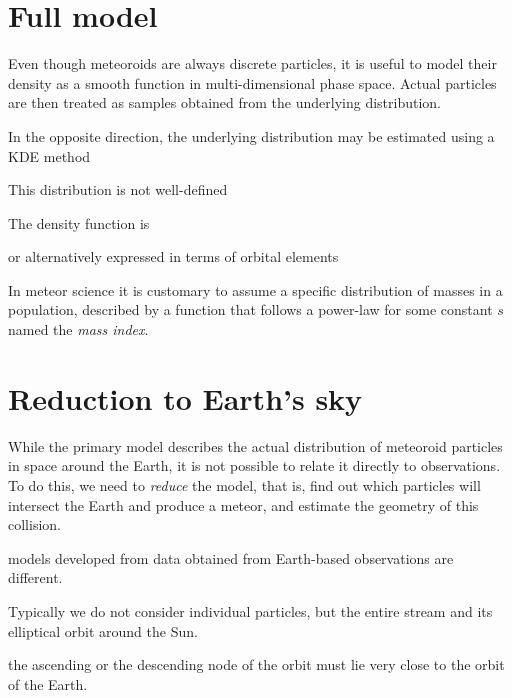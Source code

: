 
\section{Full model} \label{pf}

    Even though meteoroids are always discrete particles, it is useful to model their density as a smooth
    function in multi-dimensional phase space.
    Actual particles are then treated as samples obtained from the underlying distribution.

    In the opposite direction, the underlying distribution may be estimated using a KDE method

    This distribution is not well-defined


    The density function is 
    \eqn{eq:pf-rv}{
        \varrho(\vec{r}, \vec{v}, t) \in \left[0, \infty\right).
    }

    or alternatively expressed in terms of orbital elements

    In meteor science it is customary to assume a specific distribution of masses in a population,
    described by a function that follows a power-law
    for some constant $s$ named the \emph{mass index}.


\section{Reduction to Earth's sky} \label{ir}
    While the primary model describes the actual distribution of meteoroid particles in space around the Earth,
    it is not possible to relate it directly to observations. To do this, we need to \emph{reduce} the model,
    that is, find out which particles will intersect the Earth and produce a meteor, and estimate the geometry of this collision.


    models developed from data obtained from Earth-based observations are different.

    Typically we do not consider individual particles, but the entire stream and its elliptical orbit around the Sun.

    the ascending or the descending node of the orbit must lie very close to the orbit of the Earth.




